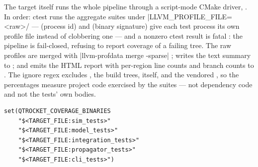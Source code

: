 The  target itself  runs the whole pipeline
through a script-mode CMake driver, . In order: ctest
runs the aggregate suites under
\cppinline|LLVM_PROFILE_FILE=<raw>/%
 ---  (process id) and  (binary
signature) give each test process its own profile file instead of clobbering one ---
and a nonzero ctest result is fatal : the pipeline
is fail-closed, refusing to report coverage of a failing tree. The raw profiles are
merged with \cppinline|llvm-profdata merge -sparse|
;  writes the text summary to
 ; and
 emits the HTML report with per-region line counts and branch counts
to  . The
ignore regex excludes , the build trees,  itself, and the
vendored  , so the percentages
measure project code exercised by the suites --- not dependency code and not the tests'
own bodies.

\begin{listing}[htbp]
\begin{verbatim}
set(QTROCKET_COVERAGE_BINARIES
    "$<TARGET_FILE:sim_tests>"
    "$<TARGET_FILE:model_tests>"
    "$<TARGET_FILE:integration_tests>"
    "$<TARGET_FILE:propagator_tests>"
    "$<TARGET_FILE:cli_tests>")
\end{verbatim}
\caption{The coverage target's binary list  --- five
binaries, not six. The same five names appear in the target's 
, while the test-selection regex matches all seven
aggregates .}\label{lst:testing-covbins}
\end{listing}

